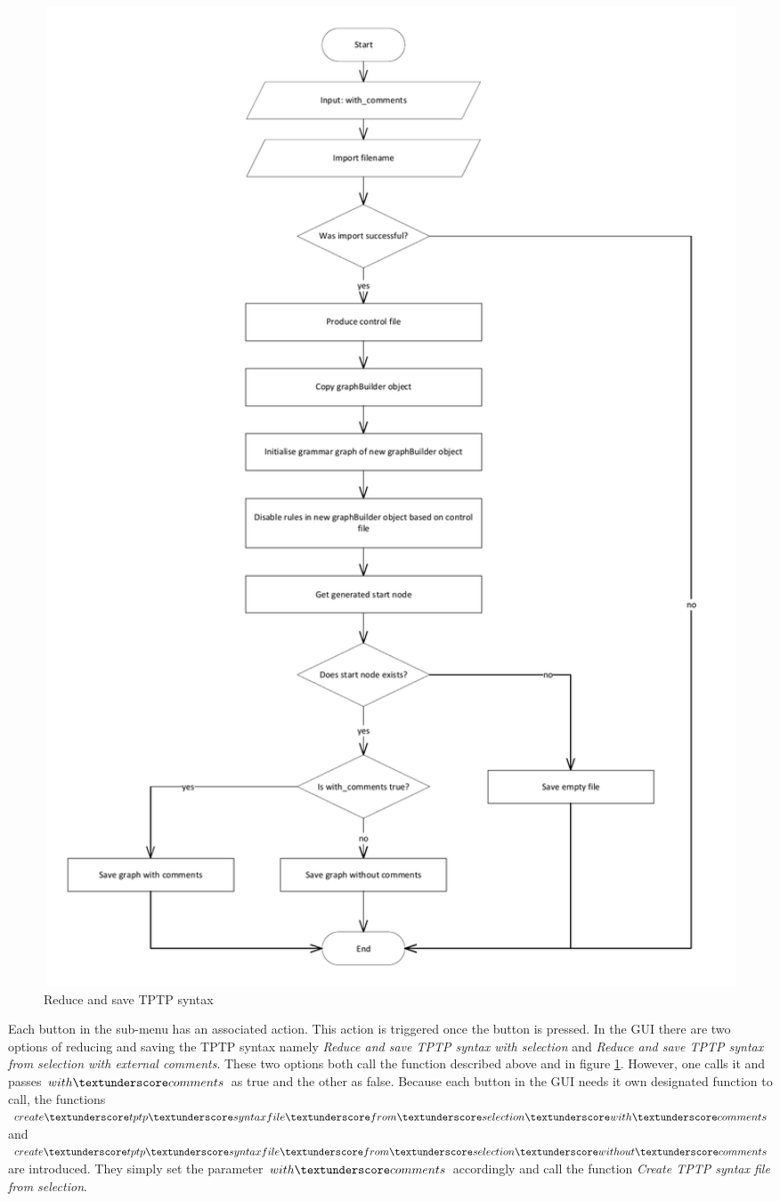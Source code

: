 \begin{figure}[H]
\includegraphics[width=1.05\textwidth]{images/implementation_reduce_and_save_tptp_syntax.pdf}
\caption{Reduce and save \ac{TPTP} syntax}
\label{fig:ImplementationGUIReduceandSave}
\end{figure}

Each button in the sub-menu has an associated action. This action is triggered once the button is pressed. In the GUI there are two options of reducing and saving the \ac{TPTP} syntax namely \textit{Reduce and save \ac{TPTP} syntax with selection} and \textit{Reduce and save \ac{TPTP} syntax from selection with external comments}. These two options both call the function described above and in figure \ref{fig:ImplementationGUIReduceandSave}. However, one calls it and passes $with\textunderscore comments$ as true and the other as false. Because each button in the GUI needs it own designated function to call, the functions $create\textunderscore tptp\textunderscore syntax file\textunderscore from\textunderscore selection\textunderscore with\textunderscore comments$ and $create\textunderscore tptp\textunderscore syntax file\textunderscore from\textunderscore selection\textunderscore without\textunderscore comments$ are introduced. They simply set the parameter $with\textunderscore comments$ accordingly and call the function \textit{Create \ac{TPTP} syntax file from selection}.


